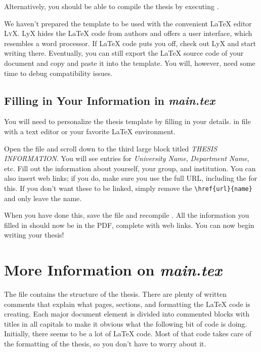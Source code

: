 Alternatively, you should be able to compile the thesis by executing .

We haven't prepared the template to be used with the convenient LaTeX editor \textsc{LyX}. LyX hides the LaTeX code from authors and offers a user interface, which resembles a word processor. If LaTeX code puts you off, check out LyX and start writing there. Eventually, you can still export the LaTeX source code of your document and copy and paste it into the template. You will, however, need some time to debug compatibility issues.

\subsection{Filling in Your Information in \emph{main.tex}}\label{FillingFile}

You will need to personalize the thesis template by filling in your details. in   file with a text editor or your favorite LaTeX environment.

Open the file and scroll down to the third large block titled \emph{THESIS INFORMATION}. You will see entries for \emph{University Name}, \emph{Department Name}, etc. Fill out the information about yourself, your group, and institution.%
You can also insert web links; if you do, make sure you use the full URL, including the  for this. If you don't want these to be linked, simply remove the \verb|\href{url}{name}| and only leave the name.

When you have done this, save the file and recompile . All the information you filled in should now be in the PDF, complete with web links. You can now begin writing your thesis!


\section{More Information on \emph{main.tex}}

The  file contains the structure of the thesis. There are plenty of written comments that explain what pages, sections, and formatting the LaTeX code is creating. Each major document element is divided into commented blocks with titles in all capitals to make it obvious what the following bit of code is doing. Initially, there seems to be a lot of LaTeX code. Most of that code takes care of the formatting of the thesis, so you don't have to worry about it.

